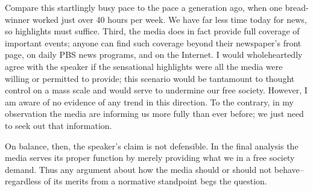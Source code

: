 Compare this startlingly busy pace to the pace a generation ago, when one bread-winner worked just over 40 hours per week.
We have far less time today for news, so highlights must suffice.
Third, the media does in fact provide full coverage of important events; anyone can find such coverage beyond their newspaper's front page, on daily PBS news programs, and on the Internet.
I would wholeheartedly agree with the speaker if the sensational highlights were all the media were willing or permitted to provide; this scenario would be tantamount to thought control on a mass scale and would serve to undermine our free society.
However, I am aware of no evidence of any trend in this direction.
To the contrary, in my observation the media are informing us more fully than ever before; we just need to seek out that information.


On balance, then, the speaker's claim is not defensible.
In the final analysis the media serves its proper function by merely providing what we in a free society demand.
Thus any argument about how the media should or should not behave--regardless of its merits from a normative standpoint begs the question.
